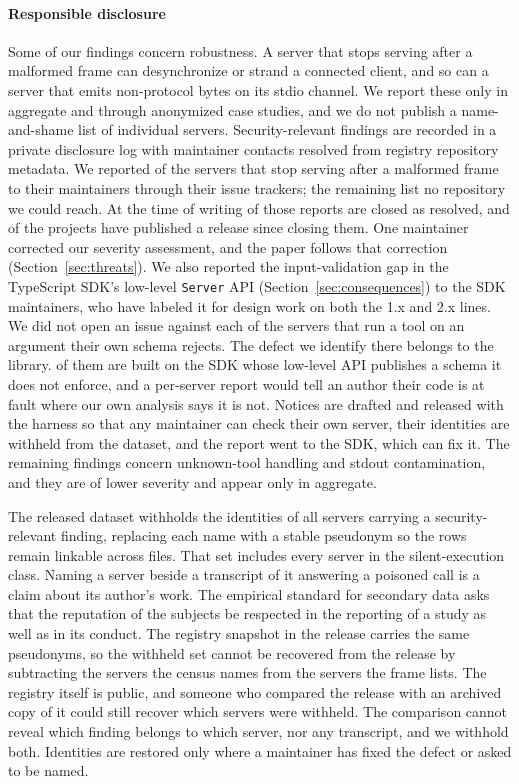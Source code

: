 \paragraph{Responsible disclosure}
Some of our findings concern robustness. A server that stops serving after a
malformed frame can desynchronize or strand a connected client, and so can a server
that emits non-protocol bytes on its stdio channel. We report these
only in aggregate and through anonymized case studies, and we do not publish a
name-and-shame list of individual servers. Security-relevant findings are recorded
in a private disclosure log with maintainer contacts resolved from registry
repository metadata. We reported \NMalformedReported{} of the \NMalformedDies{} servers that stop serving
after a malformed frame to their maintainers through their issue trackers; the
remaining \NMalformedUnreachable{} list no repository we could reach. At the time of
writing \NMalformedFixed{} of those reports are closed as resolved, and
\NMalformedReleased{} of the projects have published a release since closing them. One
maintainer corrected our severity assessment, and the paper follows that correction
(Section~\ref{sec:threats}). We also reported the input-validation gap in the
TypeScript SDK's low-level \texttt{Server} API (Section~\ref{sec:consequences}) to
the SDK maintainers, who have labeled it for design work on both the 1.x and 2.x
lines. We did not open an issue against each of the \NSilentNotices{} servers that run a
tool on an argument their own schema rejects. The defect we identify there belongs to the library.
\SilentExecTS{} of them are built on the SDK whose low-level API publishes a schema it
does not enforce, and a per-server report would tell an author their code is at fault
where our own analysis says it is not.
Notices are drafted and released with the harness so that any maintainer can check
their own server, their identities are withheld from the dataset, and the report went to the SDK, which
can fix it. The
remaining findings concern unknown-tool handling and stdout contamination, and they
are of lower severity and appear only in aggregate.

The released dataset withholds the identities of all \NWithheld{} servers carrying a
security-relevant finding, replacing each name with a stable pseudonym so the rows
remain linkable across files. That set includes every server in the silent-execution
class. Naming a server beside a transcript of it answering a poisoned call is a
claim about its author's work. The empirical standard for secondary data asks that
the reputation of the subjects be respected in the reporting of a study as well as
in its conduct. The registry snapshot in the release carries the same pseudonyms, so the withheld
set cannot be recovered from the release by subtracting the servers the census names
from the servers the frame lists. The registry itself is public, and someone who
compared the release with an archived copy of it could still recover which servers
were withheld. The comparison cannot reveal which finding belongs to which server,
nor any transcript, and we withhold both. Identities are restored only
where a maintainer has fixed the defect or asked to be named.

